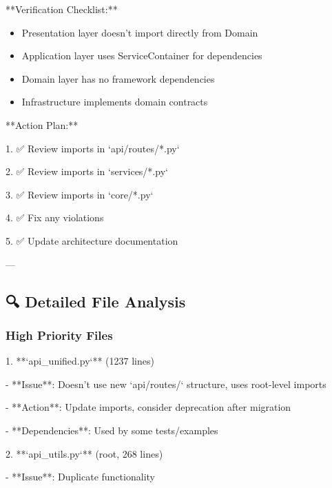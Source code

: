 \documentclass[11pt,a4paper]{article}
\begin{document}
**Verification Checklist:**

\begin{itemize}
\item [ ] Presentation layer doesn't import directly from Domain
\end{itemize}

\begin{itemize}
\item [ ] Application layer uses ServiceContainer for dependencies
\end{itemize}

\begin{itemize}
\item [ ] Domain layer has no framework dependencies
\end{itemize}

\begin{itemize}
\item [ ] Infrastructure implements domain contracts
\end{itemize}

**Action Plan:**

1. ✅ Review imports in `api/routes/*.py`

2. ✅ Review imports in `services/*.py`

3. ✅ Review imports in `core/*.py`

4. ✅ Fix any violations

5. ✅ Update architecture documentation

---

\subsection{🔍 Detailed File Analysis}

\subsubsection{High Priority Files}

1. **`api\_unified.py`** (1237 lines)

   - **Issue**: Doesn't use new `api/routes/` structure, uses root-level imports

   - **Action**: Update imports, consider deprecation after migration

   - **Dependencies**: Used by some tests/examples

2. **`api\_utils.py`** (root, 268 lines)

   - **Issue**: Duplicate functionality
\end{document}
